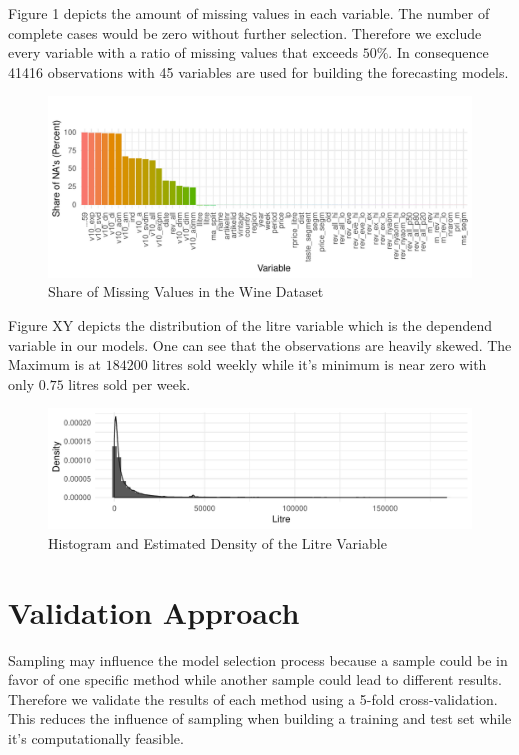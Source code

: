 \documentclass[11pt,]{article}
\begin{document}
Figure 1 depicts the amount of missing values in each variable. The
number of complete cases would be zero without further selection.
Therefore we exclude every variable with a ratio of missing values that
exceeds \(50\%\). In consequence 41416 observations with 45 variables
are used for building the forecasting models.

\begin{figure}
\centering
\includegraphics{../00_data/output_paper/02_missings_alt.pdf}
\caption{Share of Missing Values in the Wine Dataset}
\end{figure}

Figure XY depicts the distribution of the litre variable which is the
dependend variable in our models. One can see that the observations are
heavily skewed. The Maximum is at \(184200\) litres sold weekly while
it's minimum is near zero with only \(0.75\) litres sold per week.

\begin{figure}
\centering
\includegraphics{../00_data/output_paper/04_hist_litre.pdf}
\caption{Histogram and Estimated Density of the Litre Variable}
\end{figure}

\hypertarget{validation-approach}{%
\section{Validation Approach}\label{validation-approach}}

Sampling may influence the model selection process because a sample
could be in favor of one specific method while another sample could lead
to different results. Therefore we validate the results of each method
using a 5-fold cross-validation. This reduces the influence of sampling
when building a training and test set while it's computationally
feasible.
\end{document}
